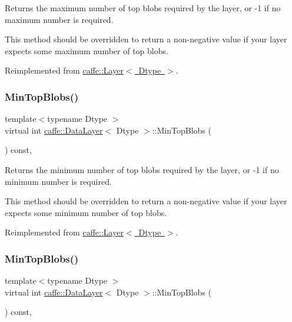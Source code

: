 Returns the maximum number of top blobs required by the layer, or -\/1 if no maximum number is required. 

This method should be overridden to return a non-\/negative value if your layer expects some maximum number of top blobs. 

Reimplemented from \mbox{\hyperlink{classcaffe_1_1_layer_ac6c03df0b6e40e776c94001e19994a2e}{caffe\+::\+Layer$<$ Dtype $>$}}.

\mbox{\label{classcaffe_1_1_data_layer_ab0c5a7504085a6699272cdcfa8611887}} 
\subsubsection{\texorpdfstring{Min\+Top\+Blobs()}{MinTopBlobs()}\hspace{0.1cm}{\footnotesize\ttfamily [1/2]}}
{\footnotesize\ttfamily template$<$typename Dtype $>$ \\
virtual int \mbox{\hyperlink{classcaffe_1_1_data_layer}{caffe\+::\+Data\+Layer}}$<$ Dtype $>$\+::Min\+Top\+Blobs (\begin{DoxyParamCaption}{ }\end{DoxyParamCaption}) const\hspace{0.3cm}{\ttfamily [inline]}, {\ttfamily [virtual]}}



Returns the minimum number of top blobs required by the layer, or -\/1 if no minimum number is required. 

This method should be overridden to return a non-\/negative value if your layer expects some minimum number of top blobs. 

Reimplemented from \mbox{\hyperlink{classcaffe_1_1_layer_ab9e4c8d642e413948b131d851a8462a4}{caffe\+::\+Layer$<$ Dtype $>$}}.

\mbox{\label{classcaffe_1_1_data_layer_ab0c5a7504085a6699272cdcfa8611887}} 
\subsubsection{\texorpdfstring{Min\+Top\+Blobs()}{MinTopBlobs()}\hspace{0.1cm}{\footnotesize\ttfamily [2/2]}}
{\footnotesize\ttfamily template$<$typename Dtype $>$ \\
virtual int \mbox{\hyperlink{classcaffe_1_1_data_layer}{caffe\+::\+Data\+Layer}}$<$ Dtype $>$\+::Min\+Top\+Blobs (\begin{DoxyParamCaption}{ }\end{DoxyParamCaption}) const\hspace{0.3cm}{\ttfamily [inline]}, {\ttfamily [virtual]}}



